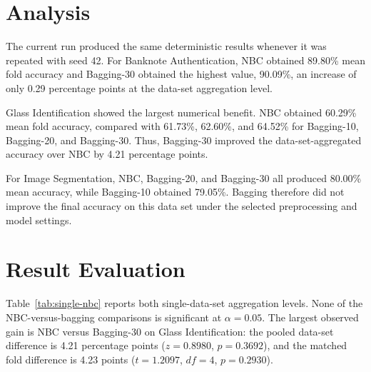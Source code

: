 \documentclass[11pt]{article}
\begin{document}
\section{Analysis}
The current run produced the same deterministic results whenever it was repeated with seed 42. For Banknote Authentication, NBC obtained 89.80\% mean fold accuracy and Bagging-30 obtained the highest value, 90.09\%, an increase of only 0.29 percentage points at the data-set aggregation level.

Glass Identification showed the largest numerical benefit. NBC obtained 60.29\% mean fold accuracy, compared with 61.73\%, 62.60\%, and 64.52\% for Bagging-10, Bagging-20, and Bagging-30. Thus, Bagging-30 improved the data-set-aggregated accuracy over NBC by 4.21 percentage points.

For Image Segmentation, NBC, Bagging-20, and Bagging-30 all produced 80.00\% mean accuracy, while Bagging-10 obtained 79.05\%. Bagging therefore did not improve the final accuracy on this data set under the selected preprocessing and model settings.

\section{Result Evaluation}
Table~\ref{tab:single-nbc} reports both single-data-set aggregation levels. None of the NBC-versus-bagging comparisons is significant at $\alpha=0.05$. The largest observed gain is NBC versus Bagging-30 on Glass Identification: the pooled data-set difference is 4.21 percentage points ($z=0.8980$, $p=0.3692$), and the matched fold difference is 4.23 points ($t=1.2097$, $df=4$, $p=0.2930$).
\end{document}
